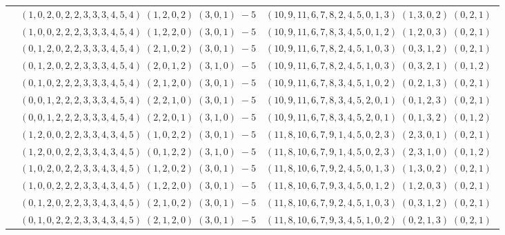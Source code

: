\documentclass[11pt]{article}
\begin{document}
\begin{longtable}[l]{|c|c|c|}
 \cline{2-3} 
 & $(1 ,0 ,2 ,0 ,2 ,2 ,3 ,3 ,3 ,4 ,5 ,4) \;(1 ,2 ,0 ,2) \;(3 ,0 ,1) \;-5$ & $(10 ,9 ,11 ,6 ,7 ,8 ,2 ,4 ,5 ,0 ,1 ,3) \;(1 ,3 ,0 ,2) \;(0 ,2 ,1) \;$\\ 
 \cline{2-3} 
 & $(1 ,0 ,0 ,2 ,2 ,2 ,3 ,3 ,3 ,4 ,5 ,4) \;(1 ,2 ,2 ,0) \;(3 ,0 ,1) \;-5$ & $(10 ,9 ,11 ,6 ,7 ,8 ,3 ,4 ,5 ,0 ,1 ,2) \;(1 ,2 ,0 ,3) \;(0 ,2 ,1) \;$\\ 
 \cline{2-3} 
 & $(0 ,1 ,2 ,0 ,2 ,2 ,3 ,3 ,3 ,4 ,5 ,4) \;(2 ,1 ,0 ,2) \;(3 ,0 ,1) \;-5$ & $(10 ,9 ,11 ,6 ,7 ,8 ,2 ,4 ,5 ,1 ,0 ,3) \;(0 ,3 ,1 ,2) \;(0 ,2 ,1) \;$\\ 
 \cline{2-3} 
 & $(0 ,1 ,2 ,0 ,2 ,2 ,3 ,3 ,3 ,4 ,5 ,4) \;(2 ,0 ,1 ,2) \;(3 ,1 ,0) \;-5$ & $(10 ,9 ,11 ,6 ,7 ,8 ,2 ,4 ,5 ,1 ,0 ,3) \;(0 ,3 ,2 ,1) \;(0 ,1 ,2) \;$\\ 
 \cline{2-3} 
 & $(0 ,1 ,0 ,2 ,2 ,2 ,3 ,3 ,3 ,4 ,5 ,4) \;(2 ,1 ,2 ,0) \;(3 ,0 ,1) \;-5$ & $(10 ,9 ,11 ,6 ,7 ,8 ,3 ,4 ,5 ,1 ,0 ,2) \;(0 ,2 ,1 ,3) \;(0 ,2 ,1) \;$\\ 
 \cline{2-3} 
 & $(0 ,0 ,1 ,2 ,2 ,2 ,3 ,3 ,3 ,4 ,5 ,4) \;(2 ,2 ,1 ,0) \;(3 ,0 ,1) \;-5$ & $(10 ,9 ,11 ,6 ,7 ,8 ,3 ,4 ,5 ,2 ,0 ,1) \;(0 ,1 ,2 ,3) \;(0 ,2 ,1) \;$\\ 
 \cline{2-3} 
 & $(0 ,0 ,1 ,2 ,2 ,2 ,3 ,3 ,3 ,4 ,5 ,4) \;(2 ,2 ,0 ,1) \;(3 ,1 ,0) \;-5$ & $(10 ,9 ,11 ,6 ,7 ,8 ,3 ,4 ,5 ,2 ,0 ,1) \;(0 ,1 ,3 ,2) \;(0 ,1 ,2) \;$\\ 
 \cline{2-3} 
 & $(1 ,2 ,0 ,0 ,2 ,2 ,3 ,3 ,4 ,3 ,4 ,5) \;(1 ,0 ,2 ,2) \;(3 ,0 ,1) \;-5$ & $(11 ,8 ,10 ,6 ,7 ,9 ,1 ,4 ,5 ,0 ,2 ,3) \;(2 ,3 ,0 ,1) \;(0 ,2 ,1) \;$\\ 
 \cline{2-3} 
 & $(1 ,2 ,0 ,0 ,2 ,2 ,3 ,3 ,4 ,3 ,4 ,5) \;(0 ,1 ,2 ,2) \;(3 ,1 ,0) \;-5$ & $(11 ,8 ,10 ,6 ,7 ,9 ,1 ,4 ,5 ,0 ,2 ,3) \;(2 ,3 ,1 ,0) \;(0 ,1 ,2) \;$\\ 
 \cline{2-3} 
 & $(1 ,0 ,2 ,0 ,2 ,2 ,3 ,3 ,4 ,3 ,4 ,5) \;(1 ,2 ,0 ,2) \;(3 ,0 ,1) \;-5$ & $(11 ,8 ,10 ,6 ,7 ,9 ,2 ,4 ,5 ,0 ,1 ,3) \;(1 ,3 ,0 ,2) \;(0 ,2 ,1) \;$\\ 
 \cline{2-3} 
 & $(1 ,0 ,0 ,2 ,2 ,2 ,3 ,3 ,4 ,3 ,4 ,5) \;(1 ,2 ,2 ,0) \;(3 ,0 ,1) \;-5$ & $(11 ,8 ,10 ,6 ,7 ,9 ,3 ,4 ,5 ,0 ,1 ,2) \;(1 ,2 ,0 ,3) \;(0 ,2 ,1) \;$\\ 
 \cline{2-3} 
 & $(0 ,1 ,2 ,0 ,2 ,2 ,3 ,3 ,4 ,3 ,4 ,5) \;(2 ,1 ,0 ,2) \;(3 ,0 ,1) \;-5$ & $(11 ,8 ,10 ,6 ,7 ,9 ,2 ,4 ,5 ,1 ,0 ,3) \;(0 ,3 ,1 ,2) \;(0 ,2 ,1) \;$\\ 
 \cline{2-3} 
 & $(0 ,1 ,0 ,2 ,2 ,2 ,3 ,3 ,4 ,3 ,4 ,5) \;(2 ,1 ,2 ,0) \;(3 ,0 ,1) \;-5$ & $(11 ,8 ,10 ,6 ,7 ,9 ,3 ,4 ,5 ,1 ,0 ,2) \;(0 ,2 ,1 ,3) \;(0 ,2 ,1) \;$\\ 

\end{longtable}
\end{document}
